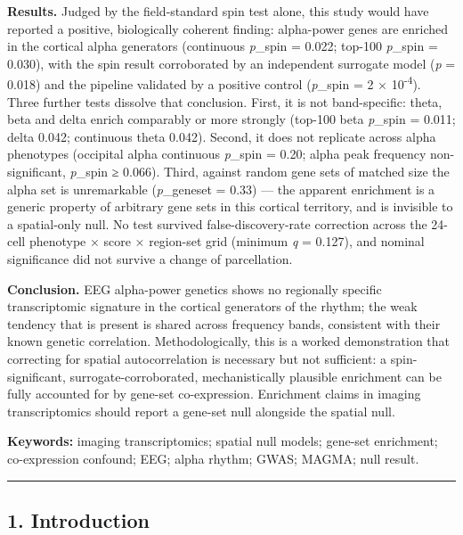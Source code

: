 \documentclass[
  11pt,
  letterpaper,
]{article}
\begin{document}
\textbf{Results.} Judged by the field-standard spin test alone, this
study would have reported a positive, biologically coherent finding:
alpha-power genes are enriched in the cortical alpha generators
(continuous \emph{p}\_spin = 0.022; top-100 \emph{p}\_spin = 0.030),
with the spin result corroborated by an independent surrogate model
(\emph{p} = 0.018) and the pipeline validated by a positive control
(\emph{p}\_spin = 2 × 10\textsuperscript{-4}). Three further tests
dissolve that conclusion. First, it is not band-specific: theta, beta
and delta enrich comparably or more strongly (top-100 beta
\emph{p}\_spin = 0.011; delta 0.042; continuous theta 0.042). Second, it
does not replicate across alpha phenotypes (occipital alpha continuous
\emph{p}\_spin = 0.20; alpha peak frequency non-significant,
\emph{p}\_spin ≥ 0.066). Third, against random gene sets of matched size
the alpha set is unremarkable (\emph{p}\_geneset = 0.33) --- the
apparent enrichment is a generic property of arbitrary gene sets in this
cortical territory, and is invisible to a spatial-only null. No test
survived false-discovery-rate correction across the 24-cell phenotype ×
score × region-set grid (minimum \emph{q} = 0.127), and nominal
significance did not survive a change of parcellation.

\textbf{Conclusion.} EEG alpha-power genetics shows no regionally
specific transcriptomic signature in the cortical generators of the
rhythm; the weak tendency that is present is shared across frequency
bands, consistent with their known genetic correlation.
Methodologically, this is a worked demonstration that correcting for
spatial autocorrelation is necessary but not sufficient: a
spin-significant, surrogate-corroborated, mechanistically plausible
enrichment can be fully accounted for by gene-set co-expression.
Enrichment claims in imaging transcriptomics should report a gene-set
null alongside the spatial null.

\textbf{Keywords:} imaging transcriptomics; spatial null models;
gene-set enrichment; co-expression confound; EEG; alpha rhythm; GWAS;
MAGMA; null result.

\begin{center}\rule{0.5\linewidth}{0.5pt}\end{center}

\subsection{1. Introduction}\label{introduction}
\end{document}
